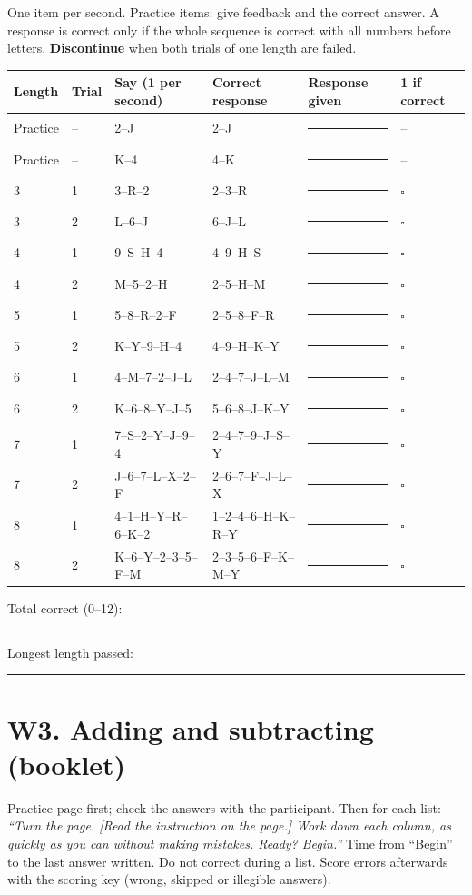 \documentclass[10pt,a4paper]{article}
\newcommand{\blank}[1][1.2cm]{\rule{#1}{0.4pt}}
\newcommand{\bx}{$\square$}
\begin{document}
One item per second. Practice items: give feedback and the correct answer. A response is correct only if the whole sequence is correct with all numbers before letters. \textbf{Discontinue} when both trials of one length are failed.
\begin{longtable}{@{}llp{4.2cm}p{4.2cm}p{3.4cm}l@{}}\toprule Length & Trial & Say (1 per second) & Correct response & Response given & 1 if correct\\ \midrule\endhead
Practice & -- & 2--J & 2--J & \blank[3.2cm] & --\\
Practice & -- & K--4 & 4--K & \blank[3.2cm] & --\\
\midrule
3 & 1 & 3--R--2 & 2--3--R & \blank[3.2cm] & \bx\\
3 & 2 & L--6--J & 6--J--L & \blank[3.2cm] & \bx\\\midrule
4 & 1 & 9--S--H--4 & 4--9--H--S & \blank[3.2cm] & \bx\\
4 & 2 & M--5--2--H & 2--5--H--M & \blank[3.2cm] & \bx\\\midrule
5 & 1 & 5--8--R--2--F & 2--5--8--F--R & \blank[3.2cm] & \bx\\
5 & 2 & K--Y--9--H--4 & 4--9--H--K--Y & \blank[3.2cm] & \bx\\\midrule
6 & 1 & 4--M--7--2--J--L & 2--4--7--J--L--M & \blank[3.2cm] & \bx\\
6 & 2 & K--6--8--Y--J--5 & 5--6--8--J--K--Y & \blank[3.2cm] & \bx\\\midrule
7 & 1 & 7--S--2--Y--J--9--4 & 2--4--7--9--J--S--Y & \blank[3.2cm] & \bx\\
7 & 2 & J--6--7--L--X--2--F & 2--6--7--F--J--L--X & \blank[3.2cm] & \bx\\\midrule
8 & 1 & 4--1--H--Y--R--6--K--2 & 1--2--4--6--H--K--R--Y & \blank[3.2cm] & \bx\\
8 & 2 & K--6--Y--2--3--5--F--M & 2--3--5--6--F--K--M--Y & \blank[3.2cm] & \bx\\\midrule
\bottomrule\end{longtable}
Total correct (0--12): \blank \quad Longest length passed: \blank
\section*{W3. Adding and subtracting (booklet)}
Practice page first; check the answers with the participant. Then for each list: \textit{``Turn the page. [Read the instruction on the page.] Work down each column, as quickly as you can without making mistakes. Ready? Begin.''} Time from ``Begin'' to the last answer written. Do not correct during a list. Score errors afterwards with the scoring key (wrong, skipped or illegible answers).
\end{document}
